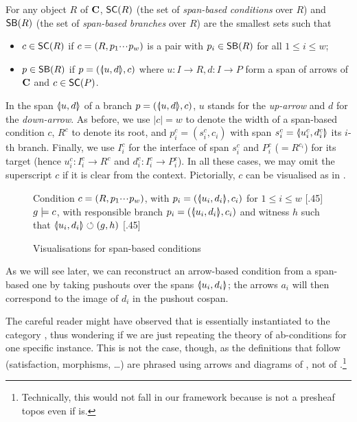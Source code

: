 \begin{definition}
  For any object $R$ of $\mathbf{C}$, $\SC R$ (the set of \emph{span-based conditions} over $R$) and $\SB R$ (the set of \emph{span-based branches} over $R$) are the smallest sets such that
  \begin{itemize}
  \item $c\in \SC R$ if $c=(R,p_1{\cdotp\mkern-2mu\cdotp\mkern-2mu\cdotp\mkern1mu} p_w)$ is a pair with $p_i\in \SB R$ for all $1\leq i\leq w$;
  \item $p\in \SB R$ if $p=(\spanof u d,c)$ where $u: I\to R, d:I\to P$ form a span of arrows of $\mathbf{C}$ and $c\in \SC P$.
  \end{itemize}
\end{definition}
%
In the span $\spanof u d$ of a branch $p=(\spanof u d,c)$, $u$ stands for the \emph{up-arrow} and $d$ for the \emph{down-arrow}. As before, we use $|c|=w$ to denote the width of a span-based condition $c$, $R^c$ to denote its root, and $p^c_i=(s^c_i,c_i)$ with span $s^c_i=\spanof{u^c_i}{d^c_i}$ its $i$-th branch. Finally, we use $I^c_i$ for the interface of span $s^c_i$ and $P^c_i$ ($=R^{c_i}$) for its target (hence $u^c_i:I^c_i\to R^c$ and $d^c_i:I^c_i\rightarrow P^c_i$). In all these cases, we may omit the superscript $c$ if it is clear from the context. Pictorially, $c$ can be visualised as in .
%
\begin{figure}
\centering
\subcaptionbox
  {Condition $c=(R,p_1{\cdotp\mkern-2mu\cdotp\mkern-2mu\cdotp\mkern1mu} p_w)$, with $p_i=(\spanof{u_i}{d_i},c_i)$ for $1\leq i\leq w$
   }
  [.45\textwidth]
  {}
\qquad
\subcaptionbox
  {$g\models c$, with responsible branch $p_i=(\spanof{u_i}{d_i},c_i)$ and witness $h$ such that $\spanof{u_i}{d_i}\commutes (g,h)$
   }
  [.45\textwidth]
  {}
\caption{Visualisations for span-based conditions}
\end{figure}
%
As we will see later, we can reconstruct an arrow-based condition from a span-based one by taking pushouts over the spans $\spanof{u_i}{d_i}$; the arrows $a_i$ will then correspond to the image of $d_i$ in the pushout cospan.

\medskip\noindent The careful reader might have observed that  is essentially  instantiated to the category {\SpanC}, thus wondering if we are just repeating the theory of ab-conditions for one specific instance. This is not the case, though, as the definitions that follow (satisfaction, morphisms, \ldots) are phrased using arrows and diagrams of , not of {\SpanC}.\footnote{Technically, this would not fall in our framework because {\SpanC} is not a presheaf topos even if  is.}

